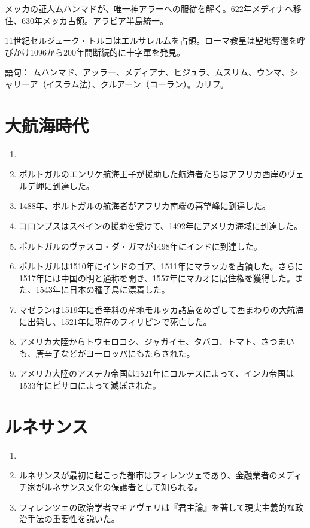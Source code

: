 \documentclass[twocolumn,autodetect-engine,dvipdfmx-if-dvi,ja=standard]{jsarticle} \usepackage{mystyle}
\begin{document}
メッカの証人ムハンマドが、唯一神アラーへの服従を解く。622年メディナへ移住、630年メッカ占領。アラビア半島統一。

11世紀セルジューク・トルコはエルサレルムを占領。ローマ教皇は聖地奪還を呼びかけ1096から200年間断続的に十字軍を発見。

語句： ムハンマド、アッラー、メディアナ、ヒジュラ、ムスリム、ウンマ、シャリーア（イスラム法）、クルアーン（コーラン）。カリフ。





\section{大航海時代}


\begin{enumerate}
\item 
\item ポルトガルのエンリケ航海王子が援助した航海者たちはアフリカ西岸のヴェルデ岬に到達した。
\item 1488年、ポルトガルの航海者がアフリカ南端の喜望峰に到達した。
\item コロンブスはスペインの援助を受けて、1492年にアメリカ海域に到達した。
\item ポルトガルのヴァスコ・ダ・ガマが1498年にインドに到達した。
\item ポルトガルは1510年にインドのゴア、1511年にマラッカを占領した。さらに1517年には中国の明と通称を開き、1557年にマカオに居住権を獲得した。また、1543年に日本の種子島に漂着した。
\item マゼランは1519年に香辛料の産地モルッカ諸島をめざして西まわりの大航海に出発し、1521年に現在のフィリピンで死亡した。
\item アメリカ大陸からトウモロコシ、ジャガイモ、タバコ、トマト、さつまいも、唐辛子などがヨーロッパにもたらされた。
\item アメリカ大陸のアステカ帝国は1521年にコルテスによって、インカ帝国は1533年にピサロによって滅ぼされた。

\end{enumerate}

\section{ルネサンス}


\begin{enumerate}
\item \item ルネサンスが最初に起こった都市はフィレンツェであり、金融業者のメディチ家がルネサンス文化の保護者として知られる。
\item フィレンツェの政治学者マキアヴェリは『君主論』を著して現実主義的な政治手法の重要性を説いた。
\end{enumerate}
\end{document}
